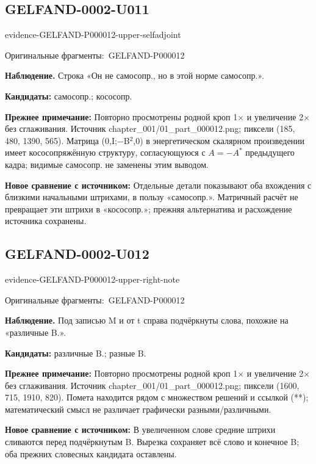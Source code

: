 \documentclass[11pt]{article}
\newcommand{\EvidenceBlock}[4]{%
 \par\smallskip\noindent\begin{minipage}{\linewidth}
 \begin{minipage}[t]{.47\linewidth}\vspace{0pt}\centering
 \csname evidence-#1-#2\endcsname\par
 {\scriptsize\SourceCropCaption\ #1}\par
 \end{minipage}\hfill
 \begin{minipage}[t]{.49\linewidth}\vspace{0pt}\raggedright
 {\small\color{orange!65!black}\textbf{#4} #3}\par
 \end{minipage}
 \end{minipage}\par\smallskip}
\newcommand{\SourceCropCaption}{Оригинальные фрагменты:}\newcommand{\ReadingCaption}{Сомнительное чтение.}\newcommand{\IncompleteCaption}{Неразобранный фрагмент.}\newcommand{\DiagramCaption}{Рисунок и набранное описание.}
\begin{document}
\subsection*{GELFAND-0002-U011}
\EvidenceBlock{GELFAND-P000012}{upper-selfadjoint}{Строка «Он не самосопр., но в этой норме самосопр.».}{Наблюдение.}
\par\smallskip\noindent\textbf{Кандидаты: } самосопр.; кососопр.\par
\par\smallskip\noindent\textbf{Прежнее примечание: } Повторно просмотрены родной кроп 1× и увеличение 2× без сглаживания. Источник chapter\_001/01\_part\_000012.png; пиксели (185, 480, 1390, 565). Матрица (0,I;−B\(^2\),0) в энергетическом скалярном произведении имеет кососопряжённую структуру, согласующуюся с \(A=-A^*\) предыдущего кадра; видимые самосопр. не заменены этим выводом.\par
\par\smallskip\noindent\textbf{Новое сравнение с источником: } Отдельные детали показывают оба вхождения с близкими начальными штрихами, в пользу «самосопр.». Матричный расчёт не превращает эти штрихи в «кососопр.»; прежняя альтернатива и расхождение источника сохранены.\par

\subsection*{GELFAND-0002-U012}
\EvidenceBlock{GELFAND-P000012}{upper-right-note}{Под записью M и от t справа подчёркнуты слова, похожие на «различные B.».}{Наблюдение.}
\par\smallskip\noindent\textbf{Кандидаты: } различные B.; разные B.\par
\par\smallskip\noindent\textbf{Прежнее примечание: } Повторно просмотрены родной кроп 1× и увеличение 2× без сглаживания. Источник chapter\_001/01\_part\_000012.png; пиксели (1600, 715, 1910, 820). Помета находится рядом с множеством решений и ссылкой (**); математический смысл не различает графически разными/различными.\par
\par\smallskip\noindent\textbf{Новое сравнение с источником: } В увеличенном слове средние штрихи сливаются перед подчёркнутым B. Вырезка сохраняет всё слово и конечное B; оба прежних словесных кандидата оставлены.\par
\end{document}
